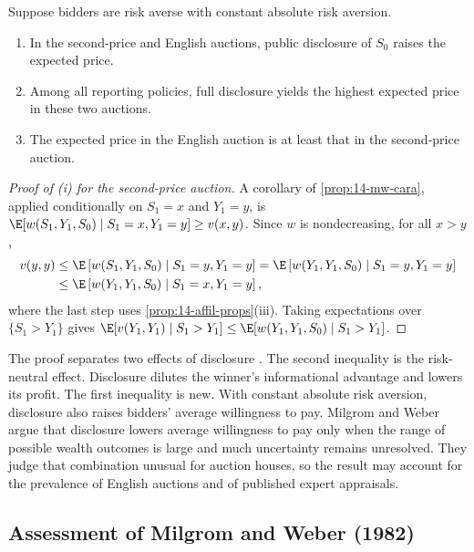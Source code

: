 \begin{proposition}\label{prop:14-mw-cara-disclosure}
Suppose bidders are risk averse with constant absolute risk aversion.
\begin{enumerate}[label=(\roman*)]
  \item In the second-price and English auctions, public disclosure of $S_0$ raises the expected price.
  \item Among all reporting policies, full disclosure yields the highest expected price in these two auctions.
  \item The expected price in the English auction is at least that in the second-price auction.
\end{enumerate}
\end{proposition}

\begin{proof}[Proof of (i) for the second-price auction]
A corollary of \cref{prop:14-mw-cara}, applied conditionally on $S_1=x$ and $Y_1=y$, is
$\E[w(S_1,Y_1,S_0)\mid S_1=x,Y_1=y]\ge v(x,y)$. Since $w$ is nondecreasing, for all $x>y$,
\begin{align*}
  v(y,y)&\le\E\left[w(S_1,Y_1,S_0)\mid S_1=y,Y_1=y\right]
  =\E\left[w(Y_1,Y_1,S_0)\mid S_1=y,Y_1=y\right]\\
  &\le\E\left[w(Y_1,Y_1,S_0)\mid S_1=x,Y_1=y\right],
\end{align*}
where the last step uses \cref{prop:14-affil-props}(iii). Taking expectations over $\{S_1>Y_1\}$ gives
$\E[v(Y_1,Y_1)\mid S_1>Y_1]\le\E[w(Y_1,Y_1,S_0)\mid S_1>Y_1]$.
\end{proof}

The proof separates two effects of disclosure \citep[p.~1117]{MilgromWeber1982}. The second inequality is the
risk-neutral effect. Disclosure dilutes the winner's informational advantage and lowers its profit. The first
inequality is new. With constant absolute risk aversion, disclosure also raises bidders' average willingness
to pay. Milgrom and Weber argue that disclosure lowers average willingness to pay only when the range of
possible wealth outcomes is large and much uncertainty remains unresolved. They judge that combination unusual
for auction houses, so the result may account for the prevalence of English auctions and of published expert
appraisals.

\subsection{Assessment of Milgrom and Weber (1982)}\label{sec:14-mw-assessment}

